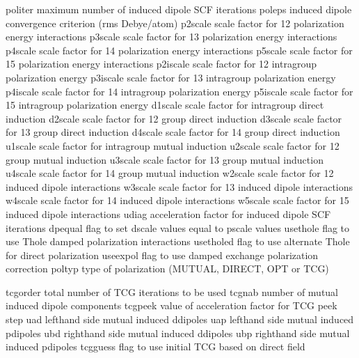\documentclass[letterpaper,11pt,english]{sphinxmanual}
\begin{document}
\begin{sphinxVerbatim}[commandchars=\\\{\}]
politer         maximum number of induced dipole SCF iterations
poleps          induced dipole convergence criterion (rms Debye/atom)
p2scale         scale factor for 1\PYGZhy{}2 polarization energy interactions
p3scale         scale factor for 1\PYGZhy{}3 polarization energy interactions
p4scale         scale factor for 1\PYGZhy{}4 polarization energy interactions
p5scale         scale factor for 1\PYGZhy{}5 polarization energy interactions
p2iscale        scale factor for 1\PYGZhy{}2 intragroup polarization energy
p3iscale        scale factor for 1\PYGZhy{}3 intragroup polarization energy
p4iscale        scale factor for 1\PYGZhy{}4 intragroup polarization energy
p5iscale        scale factor for 1\PYGZhy{}5 intragroup polarization energy
d1scale         scale factor for intra\PYGZhy{}group direct induction
d2scale         scale factor for 1\PYGZhy{}2 group direct induction
d3scale         scale factor for 1\PYGZhy{}3 group direct induction
d4scale         scale factor for 1\PYGZhy{}4 group direct induction
u1scale         scale factor for intra\PYGZhy{}group mutual induction
u2scale         scale factor for 1\PYGZhy{}2 group mutual induction
u3scale         scale factor for 1\PYGZhy{}3 group mutual induction
u4scale         scale factor for 1\PYGZhy{}4 group mutual induction
w2scale         scale factor for 1\PYGZhy{}2 induced dipole interactions
w3scale         scale factor for 1\PYGZhy{}3 induced dipole interactions
w4scale         scale factor for 1\PYGZhy{}4 induced dipole interactions
w5scale         scale factor for 1\PYGZhy{}5 induced dipole interactions
udiag           acceleration factor for induced dipole SCF iterations
dpequal         flag to set dscale values equal to pscale values
use\PYGZus{}thole       flag to use Thole damped polarization interactions
use\PYGZus{}tholed      flag to use alternate Thole for direct polarization
use\PYGZus{}expol       flag to use damped exchange polarization correction
poltyp          type of polarization (MUTUAL, DIRECT, OPT or TCG)
\end{sphinxVerbatim}

\sphinxAtStartPar
{}

\begin{sphinxVerbatim}[commandchars=\\\{\}]
tcgorder        total number of TCG iterations to be used
tcgnab          number of mutual induced dipole components
tcgpeek         value of acceleration factor for TCG peek step
uad             left\PYGZhy{}hand side mutual induced d\PYGZhy{}dipoles
uap             left\PYGZhy{}hand side mutual induced p\PYGZhy{}dipoles
ubd             right\PYGZhy{}hand side mutual induced d\PYGZhy{}dipoles
ubp             right\PYGZhy{}hand side mutual induced p\PYGZhy{}dipoles
tcgguess        flag to use initial TCG based on direct field
\end{sphinxVerbatim}
\end{document}
